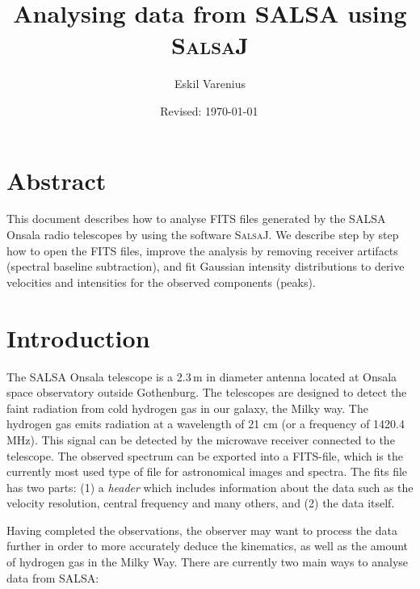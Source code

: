 \documentclass[11pt,a4paper]{article}
\begin{document}
\pagestyle{plain}
\title{\textsf{Analysing data from SALSA using \textsc{SalsaJ}}}
\author{\textsf{Eskil Varenius}}
\yyyymmdddate
\date{\textsf{Revised: \today \, \currenttime}}
 

\maketitle

\section*{Abstract}
This document describes how to analyse FITS files generated by the SALSA Onsala
radio telescopes by using the software \textsc{SalsaJ}.  We describe step by
step how to open the FITS files, improve the analysis by removing receiver
artifacts (spectral baseline subtraction), and fit Gaussian intensity
distributions to derive velocities and intensities for the observed components
(peaks).

\tableofcontents

\section{Introduction}
\label{sec:introduction}

The SALSA Onsala telescope is a 2.3\,m in diameter antenna located at
Onsala space observatory outside Gothenburg. The telescopes are
designed to detect the faint radiation from cold hydrogen gas in our
galaxy, the Milky way. The hydrogen gas emits radiation at a
wavelength of 21 cm (or a frequency of 1420.4 MHz). This signal can be
detected by the microwave receiver connected to the telescope. 
The observed spectrum can be
exported into a FITS-file, which is the currently most used type of
file for astronomical images and spectra. The fits file has two parts:
(1) a \emph{header} which includes information
about the data such as the velocity resolution, central frequency and
many others, and (2) the data itself.

Having completed the observations, the observer may want to process
the data further in order to more accurately deduce the kinematics,
as well as the amount of hydrogen gas in the Milky Way. There
are currently two main ways to analyse data from SALSA:
\end{document}
